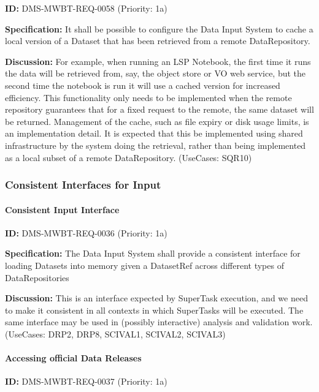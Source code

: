 \documentclass[SE,toc,lsstdraft]{lsstdoc}
\begin{document}
\label{DMS-MWBT-REQ-0058}
\textbf{ID:} DMS-MWBT-REQ-0058 (Priority: 1a)

\textbf{Specification:}
It shall be possible to configure the Data Input System to cache a local version of a Dataset that has been retrieved from a remote DataRepository.

\textbf{Discussion:}
For example, when running an LSP Notebook, the first time it runs the data will be retrieved from, say, the object store or VO web service, but the second time the notebook is run it will use a cached version for increased efficiency. This functionality only needs to be implemented when the remote repository guarantees that for a fixed request to the remote, the same dataset will be returned. Management of the cache, such as file expiry or disk usage limits, is an implementation detail. It is expected that this be implemented using shared infrastructure by the system doing the retrieval, rather than being implemented as a local subset of a remote DataRepository. (UseCases: SQR10)

\subsubsection{Consistent Interfaces for Input}

\paragraph{Consistent Input Interface}\hfill  %

\label{DMS-MWBT-REQ-0036}
\textbf{ID:} DMS-MWBT-REQ-0036 (Priority: 1a)

\textbf{Specification:}
The Data Input System shall provide a consistent interface for loading Datasets into memory given a DatasetRef across different types of DataRepositories

\textbf{Discussion:}
This is an interface expected by SuperTask execution, and we need to make it consistent in all contexts in which SuperTasks will be executed. The same interface may be used in (possibly interactive) analysis and validation work. (UseCases: DRP2, DRP8, SCIVAL1, SCIVAL2, SCIVAL3)

\paragraph{Accessing official Data Releases}\hfill  %

\label{DMS-MWBT-REQ-0037}
\textbf{ID:} DMS-MWBT-REQ-0037 (Priority: 1a)
\end{document}
